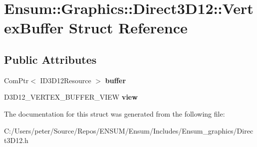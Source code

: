 \hypertarget{struct_ensum_1_1_graphics_1_1_direct3_d12_1_1_vertex_buffer}{}\section{Ensum\+:\+:Graphics\+:\+:Direct3\+D12\+:\+:Vertex\+Buffer Struct Reference}
\label{struct_ensum_1_1_graphics_1_1_direct3_d12_1_1_vertex_buffer}
\subsection*{Public Attributes}
\begin{DoxyCompactItemize}
\item 
Com\+Ptr$<$ I\+D3\+D12\+Resource $>$ {\bfseries buffer}\hypertarget{struct_ensum_1_1_graphics_1_1_direct3_d12_1_1_vertex_buffer_a5f083eda2615c59eb31ede7958a5f073}{}\label{struct_ensum_1_1_graphics_1_1_direct3_d12_1_1_vertex_buffer_a5f083eda2615c59eb31ede7958a5f073}

\item 
D3\+D12\+\_\+\+V\+E\+R\+T\+E\+X\+\_\+\+B\+U\+F\+F\+E\+R\+\_\+\+V\+I\+EW {\bfseries view}\hypertarget{struct_ensum_1_1_graphics_1_1_direct3_d12_1_1_vertex_buffer_aaab1b6da04b4aaf1fc25d378949eb3d1}{}\label{struct_ensum_1_1_graphics_1_1_direct3_d12_1_1_vertex_buffer_aaab1b6da04b4aaf1fc25d378949eb3d1}

\end{DoxyCompactItemize}


The documentation for this struct was generated from the following file\+:\begin{DoxyCompactItemize}
\item 
C\+:/\+Users/peter/\+Source/\+Repos/\+E\+N\+S\+U\+M/\+Ensum/\+Includes/\+Ensum\+\_\+graphics/Direct3\+D12.\+h\end{DoxyCompactItemize}
